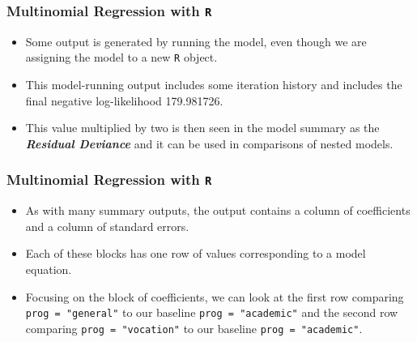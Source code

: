 \documentclass[00-GLMregslides.tex]{subfiles}
\begin{document}
\begin{frame}[fragile]

\frametitle{Multinomial Regression with \texttt{R}}
\Large
\begin{itemize}
\item Some output is generated by running the model, even though we are assigning the model to a new \texttt{R} object.
\item  This model-running output includes some iteration history and includes the final negative log-likelihood 179.981726. 
\item This value multiplied by two is then seen in the model summary as the \textbf{\textit{Residual Deviance}} and it can be used in comparisons of nested models.
\end{itemize}
\end{frame}

\begin{frame}[fragile]
	
	\frametitle{Multinomial Regression with \texttt{R}}
	\Large
	\begin{itemize}




\item As with many summary outputs, the output contains a column of coefficients and a column of standard errors. 
\item Each of these blocks has one row of values corresponding to a model equation. 
\item Focusing on the block of coefficients, we can look at the first row comparing \texttt{prog = "general"} to our baseline \texttt{prog = "academic"} and the second row comparing \texttt{prog = "vocation"} to our baseline \texttt{prog = "academic"}. 
\end{itemize}
\end{frame}
\end{document}
